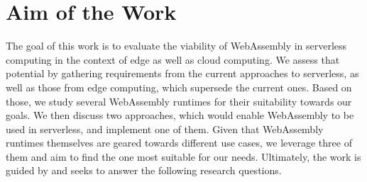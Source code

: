 



\section{Aim of the Work}

The goal of this work is to evaluate the viability of WebAssembly in serverless computing in the context of edge as well as cloud computing. We assess that potential by gathering requirements from the current approaches to serverless, as well as those from edge computing, which supersede the current ones. Based on those, we study several WebAssembly runtimes for their suitability towards our goals. We then discuss two approaches, which would enable WebAssembly to be used in serverless, and implement one of them. Given that WebAssembly runtimes themselves are geared towards different use cases, we leverage three of them and aim to find the one most suitable for our needs. Ultimately, the work is guided by and seeks to answer the following research questions.


